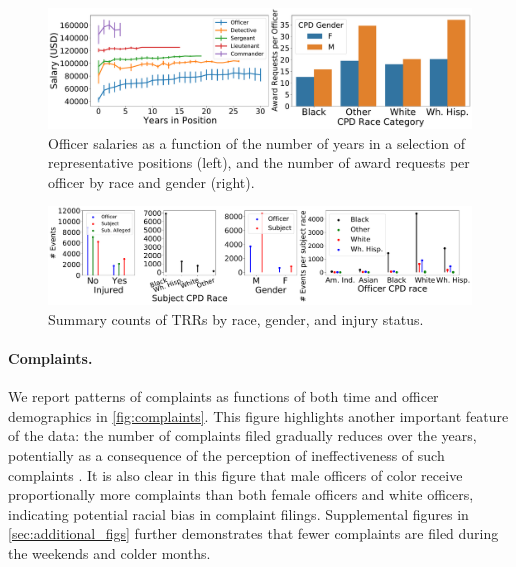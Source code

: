 \begin{figure}[t!] 
\includegraphics[width=\textwidth]{figs/salary_awards.pdf} 
\caption{Officer salaries as a function of the number of years in a selection of representative positions (left),
and the number of award requests per officer by race and gender (right).} \label{fig:salary_awards}
\end{figure}
\begin{figure}[t!] 
	\includegraphics[width=\textwidth]{figs/trr_stats} 
	\caption{Summary counts of TRRs by race, gender, and injury status.} \label{fig:trrs_stats1}
\end{figure}


\paragraph{Complaints.} 
We report patterns of complaints as functions of both time and officer
demographics in \cref{fig:complaints}. This figure highlights another important
feature of the data: the number of complaints filed gradually reduces over the
years, potentially as a consequence of the perception of ineffectiveness of
such complaints \cite{xx}.  It is also clear in this figure that male officers
of color receive proportionally more complaints than both female officers and
white officers, indicating potential racial bias in complaint filings.
Supplemental figures in \cref{sec:additional_figs} further demonstrates that
fewer complaints are filed during the weekends and colder months.

